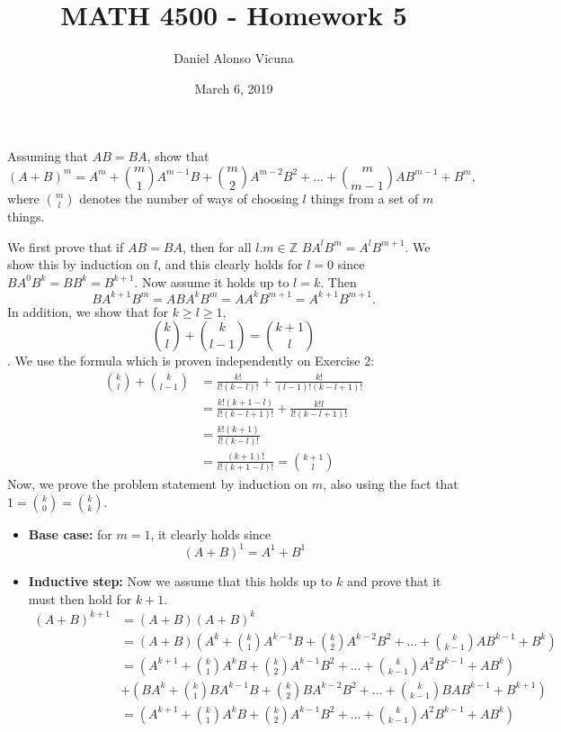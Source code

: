 \documentclass[11pt,onecolumn]{article}
\title{MATH 4500 - Homework 5}
\author{Daniel Alonso Vicuna}
\date{March 6, 2019}
\begin{document}
\maketitle

\begin{exercise}
Assuming that $AB=BA$, show that $$(A+B)^m =A^m+\binom{m}{1} A^{m-1}B+\binom{m}{2}A^{m-2}B^2+...+\binom{m}{m-1} AB^{m-1}+B^m,$$ where $\binom{m}{l}$ denotes the number of ways of choosing $l$ things from a set of $m$ things. 
\end{exercise}
\begin{answer}
We first prove that if $AB=BA$, then for all $l.m \in \mathbb{Z}$ $BA^lB^m = A^lB^{m+1}$. We show this by induction on $l$, and this clearly holds for $l=0$ since $BA^0B^k = BB^k = B^{k+1}$. Now assume it holds up to $l=k$. Then $$BA^{k+1}B^m = ABA^{k}B^m = AA^kB^{m+1} = A^{k+1}B^{m+1}.$$
In addition, we show that for $k \ge l \ge 1,$ $$ \binom{k}{l} + \binom{k}{l-1} = \binom{k+1}{l}$$. We use the formula which is proven independently on Exercise 2:
\begin{align*}
    \binom{k}{l} + \binom{k}{l-1} &= \frac{k!}{l!(k-l)!} + \frac{k!}{(l-1)!(k-l+1)!} \\
    &= \frac{k!(k+1-l)}{l!(k-l+1)!} + \frac{k!l}{l!(k-l+1)!}  \\
    &= \frac{k!(k+1)}{l!(k-l)!} \\
    &= \frac{(k+1)!}{l!(k+1-l)!} = \binom{k+1}{l}
\end{align*}
Now, we prove the problem statement by induction on $m$, also using the fact that $1 = \binom{k}{0} = \binom{k}{k} $.
\begin{itemize}
    \item \textbf{Base case:} for $m=1$, it clearly holds since $$ (A+B)^1 = A^1 + B^1 $$
    \item \textbf{Inductive step:} Now we assume that this holds up to $k$ and prove that it must then hold for $k+1$.
    \begin{align*}
        (A+B)^{k+1} &= (A+B)(A+B)^k \\
        &= (A+B)(A^k + \binom{k}{1} A^{k-1}B + \binom{k}{2}A^{k-2}B^2 + ... + \binom{k}{k-1}AB^{k-1} + B^k) \\
        &= (A^{k+1} + \binom{k}{1} A^{k}B + \binom{k}{2}A^{k-1}B^2 + ... + \binom{k}{k-1}A^2B^{k-1} + AB^k) \\
        &+ (BA^k + \binom{k}{1} BA^{k-1}B + \binom{k}{2}BA^{k-2}B^2 + ... + \binom{k}{k-1}BAB^{k-1} + B^{k+1}) \\
        &= (A^{k+1} + \binom{k}{1} A^{k}B + \binom{k}{2}A^{k-1}B^2 + ... + \binom{k}{k-1}A^2B^{k-1} + AB^k) \\

\end{align*}
\end{itemize}
\end{answer}
\end{document}
